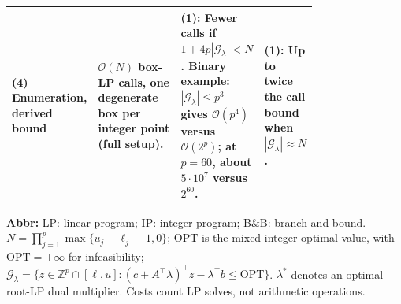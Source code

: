 \begin{table}[tp]
\begin{threeparttable}
\begin{tabularx}{\linewidth}{@{}>{\raggedright\arraybackslash}p{0.20\linewidth}>{\raggedright\arraybackslash}p{0.32\linewidth}>{\raggedright\arraybackslash}p{0.25\linewidth}>{\raggedright\arraybackslash}X@{}}
\midrule
\textbf{(4)} Enumeration, derived bound \citep{hmiRepositoryLp} & $\mathcal{O}(N)$ box-LP calls, one degenerate box per integer point (full setup). & \textbf{(1)}: Fewer calls if $1+4p|\mathcal G_\lambda|<N$. Binary example: $|\mathcal G_\lambda|\le p^3$ gives $\mathcal{O}(p^4)$ versus $\mathcal{O}(2^p)$; at $p=60$, about $5\cdot10^7$ versus $2^{60}$. & \textbf{(1)}: Up to twice the call bound when $|\mathcal G_\lambda|\approx N$. \\
\bottomrule
\end{tabularx}
\begin{tablenotes}[flushleft]\footnotesize
\item[] \textbf{Abbr:} LP: linear program; IP: integer program; B\&B: branch-and-bound. $N=\prod_{j=1}^p\max\{u_j-\ell_j+1,0\}$; $\mathrm{OPT}$ is the mixed-integer optimal value, with $\mathrm{OPT}=+\infty$ for infeasibility; $\mathcal G_\lambda=\{z\in\mathbb Z^p\cap[\ell,u]:(c+A^\top\lambda)^\top z-\lambda^\top b\le\mathrm{OPT}\}$. $\lambda^*$ denotes an optimal root-LP dual multiplier. Costs count LP solves, not arithmetic operations.
\end{tablenotes}
\end{threeparttable}
\end{table}
\clearpage

